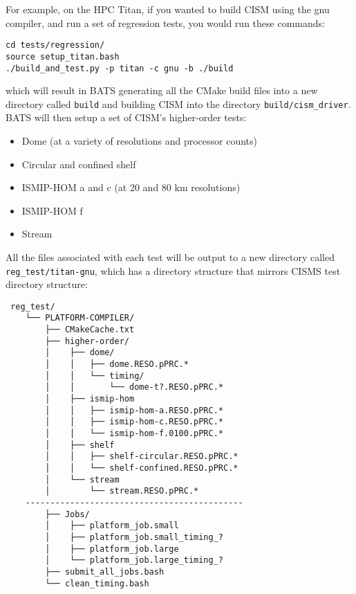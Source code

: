 \par
For example, on the HPC Titan, if you wanted to build CISM using the gnu compiler, and run a set of regression tests,
you would run these commands: 

\begin{verbatim}
cd tests/regression/
source setup_titan.bash
./build_and_test.py -p titan -c gnu -b ./build
\end{verbatim}

\noindent
which will result in BATS generating all the CMake build files into a new directory called \texttt{build} and building
CISM into the directory \texttt{build/cism\_driver}. BATS will then setup a set of CISM's higher-order tests:

\begin{itemize}
    \item Dome (at a variety of resolutions and processor counts) \\
    \item Circular and confined shelf \\
    \item ISMIP-HOM a and c (at 20 and 80 km resolutions) \\
    \item ISMIP-HOM f \\
    \item Stream \\
\end{itemize}

\par
All the files associated with each test will be output to a new directory called \texttt{reg\_test/titan-gnu}, which has a
directory structure that mirrors CISMS test directory structure:

\begin{verbatim}
 reg_test/
    └── PLATFORM-COMPILER/
        ├── CMakeCache.txt
        ├── higher-order/
        │    ├── dome/
        │    │   ├── dome.RESO.pPRC.*
        │    │   └── timing/
        │    │       └── dome-t?.RESO.pPRC.*
        │    ├── ismip-hom
        │    │   ├── ismip-hom-a.RESO.pPRC.*
        │    │   ├── ismip-hom-c.RESO.pPRC.*
        │    │   └── ismip-hom-f.0100.pPRC.*
        │    ├── shelf
        │    │   ├── shelf-circular.RESO.pPRC.*
        │    │   └── shelf-confined.RESO.pPRC.*
        │    └── stream
        │        └── stream.RESO.pPRC.*
    --------------------------------------------
        ├── Jobs/
        │    ├── platform_job.small
        │    ├── platform_job.small_timing_?
        │    ├── platform_job.large
        │    └── platform_job.large_timing_?
        ├── submit_all_jobs.bash
        └── clean_timing.bash
\end{verbatim}

